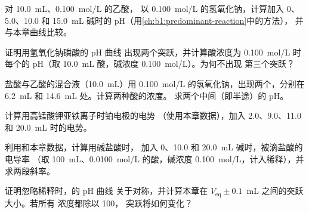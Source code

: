 \begin{exercise}[$\star\star$]\label{exo:b1:titration-methods:5}
对 \qty{10.0}{mL}、\qty{0.100}{mol/L} 的乙酸，
以 \qty{0.100}{mol/L} 的氢氧化钠，计算加入 0、5.0、10.0
和 \qty{15.0}{mL} 碱时的 pH（用\cref{ch:b1:predominant-reaction}中的方法），
并与本章曲线比较。
\end{exercise}

\begin{exercise}[$\star\star$]\label{exo:b1:titration-methods:6}
证明用氢氧化钠磷酸的 pH 曲线
出现两个突跃，并计算酸浓度为 \qty{0.100}{mol/L} 时每个的
pH（取 \qty{10.0}{mL} 酸，碱浓度 \qty{0.100}{mol/L}）。为何不出现
第三个突跃？
\end{exercise}

\begin{exercise}[$\star\star$]\label{exo:b1:titration-methods:7}
盐酸与乙酸的混合液（\qty{10.0}{mL}）用
\qty{0.100}{mol/L} 的氢氧化钠，出现两个，分别在
\qty{6.2}{mL} 和 \qty{14.6}{mL} 处。计算两种酸的浓度。
求两个中间（即半途）的 pH。
\end{exercise}

\begin{exercise}[$\star\star$]\label{exo:b1:titration-methods:8}
计算用高锰酸钾亚铁离子时铂电极的电势
（使用本章数据），加入 2.0、9.0、11.0 和
\qty{20.0}{mL} 时的电势。
\end{exercise}

\begin{exercise}[$\star\star$]\label{exo:b1:titration-methods:9}
利用和本章数据，计算用碱盐酸时，
加入 0、10.0 和 \qty{20.0}{mL} 碱时，被滴盐酸的电导率
（取 \qty{100}{mL}、\qty{0.0100}{mol/L} 的酸，碱浓度
\qty{0.100}{mol/L}，计入稀释），并求两段斜率。
\end{exercise}

\begin{exercise}[$\star\star\star$]\label{exo:b1:titration-methods:10}
证明忽略稀释时，的 pH 曲线
关于对称，并计算本章在
$V_{\mathrm{eq}} \pm 0.1$~mL 之间的突跃大小。若所有
浓度都除以 100，
突跃将如何变化？
\end{exercise}

